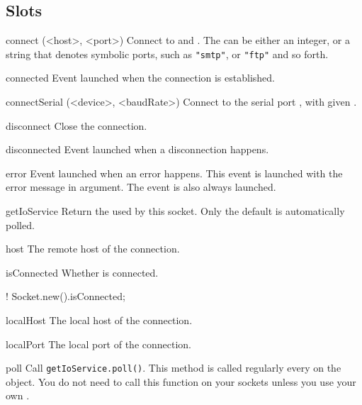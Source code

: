 \subsection{Slots}
\begin{urbiscriptapi}
\item[connect](<host>, <port>)%
  Connect \this to  and .  The
   can be either an integer, or a string that denotes
  symbolic ports, such as \lstinline|"smtp"|, or \lstinline|"ftp"| and
  so forth.


\item[connected]%
  Event launched when the connection is established.


\item[connectSerial](<device>, <baudRate>)%
  Connect \this to the serial port , with given
  .


\item[disconnect]%
  Close the connection.


\item[disconnected]
  Event launched when a disconnection happens.


\item[error]
  Event launched when an error happens. This event is launched with
  the error message in argument. The event  is
  also always launched.


\item[getIoService] Return the  used by this
  socket. Only the default  is automatically polled.


\item[host]
  The remote host of the connection.


\item[isConnected]
  Whether \this is connected.
\begin{urbiassert}
! Socket.new().isConnected;
\end{urbiassert}


\item[localHost]
  The local host of the connection.


\item[localPort]
  The local port of the connection.


\item[poll] Call \lstinline|getIoService.poll()|. This method is called
  regularly every  on the 
  object. You do not need to call this function on your sockets unless you
  use your own .



\end{urbiscriptapi}
